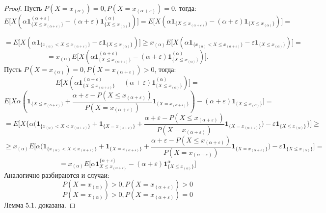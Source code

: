 \documentclass[14pt,a4paper]{article}
\theoremstyle{plain}
\theoremstyle{definition}
\begin{document}
\begin{proof}
Пусть $P(X=x_{(\alpha)})=0,P(X=x_{(\alpha + \varepsilon)})=0 $, тогда:
$$
E\Big[X(\alpha\mathbf{1}^{(\alpha + \varepsilon)}_{\{X \le x_{(\alpha + \varepsilon)}  \} } - (\alpha + \varepsilon)\mathbf{1}^{(\alpha)}_{\{X \le x_{(\alpha)}  \} } )\Big]
= E\Big[X(\alpha\mathbf{1}_{\{X \le x_{(\alpha + \varepsilon)}  \} } - (\alpha + \varepsilon)\mathbf{1}_{\{X \le x_{(\alpha)}  \} } )\Big] =
$$

$$
= E\Big[X(\alpha\mathbf{1}_{\{x_{(\alpha)} < X \le x_{(\alpha + \varepsilon)}  \} } - \varepsilon\mathbf{1}_{\{X \le x_{(\alpha)}  \} } )\Big] \ge
x_{(\alpha)}E\Big[X(\alpha\mathbf{1}_{\{x_{(\alpha)} < X \le x_{(\alpha + \varepsilon)}  \} } - \varepsilon\mathbf{1}_{\{X \le x_{(\alpha)}  \} } )\Big] =
$$
$$
= x_{(\alpha)}E\Big[X(\alpha\mathbf{1}^{(\alpha+\varepsilon)}_{\{ X \le x_{(\alpha + \varepsilon)}  \} } - (\alpha+\varepsilon)\mathbf{1}^{(\alpha)}_{\{X \le x_{(\alpha)}  \} } )\Big].
$$
Пусть $P(X=x_{(\alpha)})=0,P(X=x_{(\alpha + \varepsilon)})>0 $, тогда:
$$
E\Big[X(\alpha\mathbf{1}^{(\alpha + \varepsilon)}_{\{X \le x_{(\alpha + \varepsilon)}  \} } - (\alpha + \varepsilon)\mathbf{1}^{(\alpha)}_{\{X \le x_{(\alpha)}  \} } )\Big]
=
$$
$$
E\Big[X\alpha(\mathbf{1}_{\{X \le x_{(\alpha + \varepsilon)}  \} }+
\frac{\alpha+\varepsilon - P(X \le x_{(\alpha+\varepsilon)})}{P(X = x_{(\alpha+\varepsilon)})}\mathbf{1}_{\{X=x_{(\alpha+\varepsilon)}\}}) - (\alpha + \varepsilon)\mathbf{1}_{\{X \le x_{(\alpha)}  \} } \Big]=
$$
$$
= E\Big[X\Big\{\alpha\big(\mathbf{1}_{\{x_{(\alpha)} < X < x_{(\alpha + \varepsilon)}  \} }+ \mathbf{1}_{ \{ X = x_{(\alpha + \varepsilon)}  \} } +
\frac{\alpha+\varepsilon - P(X \le x_{(\alpha+\varepsilon)})}{P(X = x_{(\alpha+\varepsilon)})}\mathbf{1}_{\{X=x_{(\alpha+\varepsilon)}\}}\big) - \varepsilon\mathbf{1}_{\{X \le x_{(\alpha)}  \}}\Big\}\Big] \ge
$$
$$
\ge x_{(\alpha)} E\Big[\alpha\big(\mathbf{1}_{\{x_{(\alpha)} < X < x_{(\alpha + \varepsilon)}  \} }+ \mathbf{1}_{ \{ X = x_{(\alpha + \varepsilon)}  \} } +
\frac{\alpha+\varepsilon - P(X \le x_{(\alpha+\varepsilon)})}{P(X = x_{(\alpha+\varepsilon)})}\mathbf{1}_{\{X=x_{(\alpha+\varepsilon)}\}}\big) - \varepsilon\mathbf{1}_{\{X \le x_{(\alpha)}  \}}\Big] =
$$
$$
= x_{(\alpha)} E\Big[ \alpha\mathbf{1}^{\{\alpha+\varepsilon\}}_{X \le x_{(\alpha+\varepsilon)}} - (\alpha+\varepsilon)\mathbf{1}^{\alpha}_{\{X \le x_{(\alpha)}\}}    \Big]
$$
Аналогично разбираются и случаи:
$$
P(X=x_{(\alpha)})>0,P(X=x_{(\alpha + \varepsilon)})>0
$$
$$
P(X=x_{(\alpha)})>0,P(X=x_{(\alpha + \varepsilon)})=0
$$
Лемма 5.1. доказана.

\end{proof}
\end{document}
